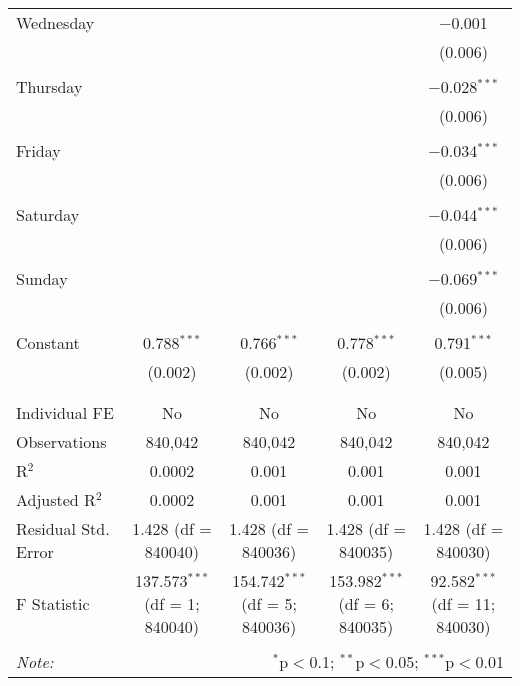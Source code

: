\documentclass[
]{article}
\begin{document}
\begin{table}[!htbp]
{\begin{tabular}{@{\extracolsep{5pt}}lcccc}
 Wednesday &  &  &  & $-$0.001 \\ 
  &  &  &  & (0.006) \\ 
  & & & & \\ 
 Thursday &  &  &  & $-$0.028$^{***}$ \\ 
  &  &  &  & (0.006) \\ 
  & & & & \\ 
 Friday &  &  &  & $-$0.034$^{***}$ \\ 
  &  &  &  & (0.006) \\ 
  & & & & \\ 
 Saturday &  &  &  & $-$0.044$^{***}$ \\ 
  &  &  &  & (0.006) \\ 
  & & & & \\ 
 Sunday &  &  &  & $-$0.069$^{***}$ \\ 
  &  &  &  & (0.006) \\ 
  & & & & \\ 
 Constant & 0.788$^{***}$ & 0.766$^{***}$ & 0.778$^{***}$ & 0.791$^{***}$ \\ 
  & (0.002) & (0.002) & (0.002) & (0.005) \\ 
  & & & & \\ 
\hline \\[-1.8ex] 
Individual FE & No & No & No & No \\ 
Observations & 840,042 & 840,042 & 840,042 & 840,042 \\ 
R$^{2}$ & 0.0002 & 0.001 & 0.001 & 0.001 \\ 
Adjusted R$^{2}$ & 0.0002 & 0.001 & 0.001 & 0.001 \\ 
Residual Std. Error & 1.428 (df = 840040) & 1.428 (df = 840036) & 1.428 (df = 840035) & 1.428 (df = 840030) \\ 
F Statistic & 137.573$^{***}$ (df = 1; 840040) & 154.742$^{***}$ (df = 5; 840036) & 153.982$^{***}$ (df = 6; 840035) & 92.582$^{***}$ (df = 11; 840030) \\ 
\hline 
\hline \\[-1.8ex] 
\textit{Note:}  & \multicolumn{4}{r}{$^{*}$p$<$0.1; $^{**}$p$<$0.05; $^{***}$p$<$0.01} \\ 
\end{tabular}
} 
\end{table} 
\newpage
\end{document}
